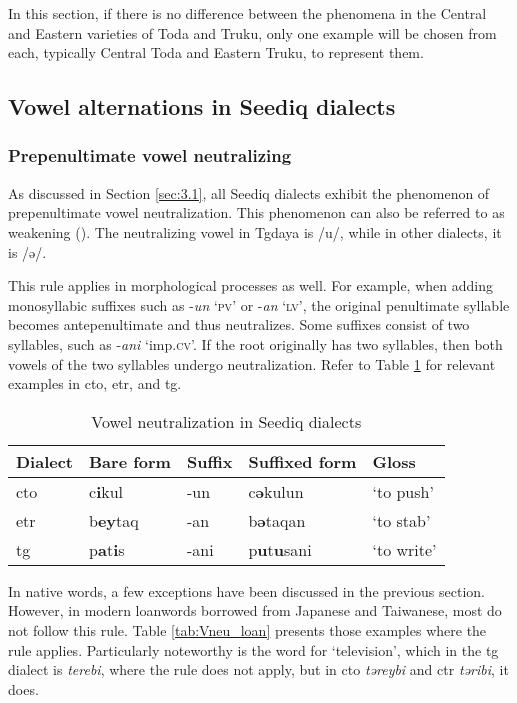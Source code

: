 In this section, if there is no difference between the phenomena in the Central and Eastern varieties of Toda and Truku, only one example will be chosen from each, typically Central Toda and Eastern Truku, to represent them.

\subsection{Vowel alternations in Seediq dialects}

\subsubsection{Prepenultimate vowel neutralizing}

As discussed in Section \ref{sec:3.1}, all Seediq dialects exhibit the phenomenon of prepenultimate vowel neutralization. This phenomenon can also be referred to as weakening (\cite[22--23]{Lee2018Trugrammar}). The neutralizing vowel in Tgdaya is /u/, while in other dialects, it is /ə/. 

This rule applies in morphological processes as well. For example, when adding monosyllabic suffixes such as -\textit{un} `\textsc{pv}' or -\textit{an} `\textsc{lv}', the original penultimate syllable becomes antepenultimate and thus neutralizes. Some suffixes consist of two syllables, such as -\textit{ani} `\acs{imp}.\textsc{cv}'. If the root originally has two syllables, then both vowels of the two syllables undergo neutralization. Refer to Table \ref{tab:Vneu} for relevant examples in \acl{cto}, \acl{etr}, and \acl{tg}.

\begin{table}[!htbp]
\centering
\caption{Vowel neutralization in Seediq dialects}
\label{tab:Vneu}
\begin{tabular}{lllll}
\hline
Dialect   & Bare form & Suffix & Suffixed form & Gloss      \\ \hline
\acl{cto} & c\textbf{i}kul     & -un    & c\textbf{ə}kulun       & `to push'  \\
\acl{etr} & b\textbf{ey}taq    & -an    & b\textbf{ə}taqan       & `to stab'  \\
\acl{tg}  & p\textbf{a}t\textbf{i}s     & -ani   & p\textbf{u}t\textbf{u}sani      & `to write' \\ \hline
\end{tabular}
\end{table}

In native words, a few exceptions have been discussed in the previous section. However, in modern loanwords borrowed from Japanese and Taiwanese, most do not follow this rule. Table \ref{tab:Vneu_loan} presents those examples where the rule applies. Particularly noteworthy is the word for `television', which in the \acl{tg} dialect is \textit{terebi}, where the rule does not apply, but in \acl{cto} \textit{təreybi} and \acl{ctr} \textit{təribi}, it does.

